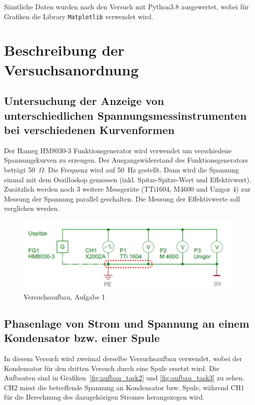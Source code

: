 \documentclass{article}
\begin{document}
Sämtliche Daten wurden nach den Versuch mit Python3.8 ausgewertet, wobei für Grafiken die Library \texttt{Matplotlib} verwendet wird. 





\section{Beschreibung der Versuchsanordnung}


\subsection{Untersuchung  der  Anzeige  von  unterschiedlichen  Spannungsmessinstrumenten  bei verschiedenen Kurvenformen}
\label{subsec:aufbau_task1}

Der Hameg HM8030-3 Funktionsgenerator wird verwendet um verschiedene Spannungskurven zu erzeugen. Der Ausgangswiderstand des Funktionsgenerators beträgt 50~$\Omega$. Die Frequenz wird auf 50~Hz gestellt. Dann wird die Spannung einmal mit dem Oszilloskop gemessen (inkl. Spitze-Spitze-Wert und Effektivwert). Zusätzlich werden noch 3 weitere Messgeräte (TTi1604, M4600 und Unigor 4) zur Messung der Spannung parallel geschalten. Die Messung der Effektivwerte soll verglichen werden.


\begin{figure}[H]
\centering
\caption{Versuchsaufbau, Aufgabe 1}
\label{fig:aufbau_task1}
\includegraphics[scale=1]{bilder/aufbau_task1.png}
\end{figure}


\subsection{Phasenlage von Strom und Spannung an einem Kondensator bzw. einer Spule}

In diesem Versuch wird zweimal derselbe Versuchsaufbau verwendet, wobei der Kondensator für den dritten Versuch durch eine Spule ersetzt wird. Die Aufbauten sind in Grafiken~\ref{fig:aufbau_task2} und \ref{fig:aufbau_task3} zu sehen. CH2 misst die betreffende Spannung an Kondensator bzw. Spule, während CH1 für die Berechnung des dazugehörigen Stromes herangezogen wird.
\end{document}
